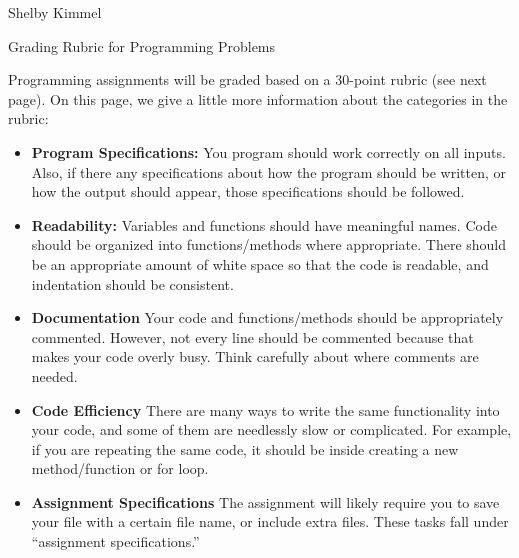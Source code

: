\documentclass[11pt,landscape]{article}
\begin{document}
\hfill Shelby Kimmel

\begin{center}
{\huge Grading Rubric for Programming Problems}
\end{center}
\bigskip

Programming assignments will be graded based on a 30-point rubric (see next page). On this page, we give a little more information about the categories in the rubric:

\begin{itemize}
\item \textbf{Program Specifications:} You program should work correctly on all inputs. Also, if there any specifications about how the program should be written, or how the output should appear, those specifications should be followed.

\item \textbf{Readability:} Variables and functions should have meaningful names. Code should be organized into functions/methods where appropriate. There should be an appropriate amount of white space so that the code is readable, and indentation should be consistent.

\item \textbf{Documentation} Your code and functions/methods should be appropriately commented. However, not every line should be commented because that makes your code overly busy. Think carefully about where comments are needed. 

\item \textbf{Code Efficiency} There are many ways to write the same functionality into your code, and some of them are needlessly slow or complicated. For example, if you are repeating the same code, it should be inside  creating a new method/function or for loop.

\item \textbf{Assignment Specifications} The assignment will likely require you to save your file with a certain file name, or include extra files. These tasks fall under ``assignment specifications.''
\end{itemize}
\end{document}
